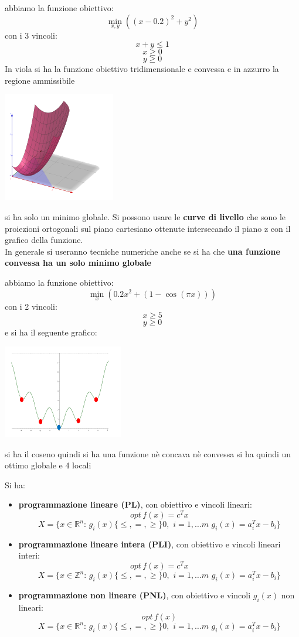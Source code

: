 \documentclass[a4paper,12pt, oneside]{book}
\begin{document}
\newpage
\begin{esempio}
  abbiamo la funzione obiettivo:
  \[\min_{x,y}((x-0.2)^2+y^2)\]
  con i 3 vincoli:
  \[x+y \leq 1\]
  \[x\geq 0\]
  \[y\geq 0\]
  In viola si ha la funzione obiettivo tridimensionale e convessa
  e in azzurro la regione ammissibile
  \begin{center}
    \includegraphics[scale = 1.3]{img/optes.png}
  \end{center}
  si ha solo un minimo globale.
  Si possono usare le \textbf{curve di livello} che sono le proiezioni
  ortogonali sul piano cartesiano ottenute intersecando il piano z con
  il grafico della funzione.\\
  In generale si useranno tecniche numeriche anche se si ha che
  \textbf{una funzione convessa ha un solo minimo globale}
\end{esempio}
\newpage
\begin{esempio}
  abbiamo la funzione obiettivo:
  \[\min_{x}(0.2x^2+(1-\cos(\pi x)))\]
  con i 2 vincoli:
  \[x\geq 5\]
  \[y\geq 0\]
  e si ha il seguente grafico:
  \begin{center}
    \includegraphics[scale = 1.3]{img/optes2.png}
  \end{center}
  si ha il coseno quindi si ha una funzione nè concava nè convessa
  si ha quindi un ottimo globale e 4 locali
\end{esempio}
Si ha:
\begin{itemize}
  \item \textbf{programmazione lineare (PL)}, con obiettivo e vincoli
  lineari:
  \[opt\,f(x)=c^T x\]
  \[X=\{x\in\mathbb{R}^n:\, g_i(x)\{\leq, =, \geq\}0,\,\,
    i=1,\ldots m\,\, g_i(x)=a_i^T x-b_i\}\]
  \item \textbf{programmazione lineare intera (PLI)}, con obiettivo e
  vincoli lineari interi:
  \[opt\,f(x)=c^T x\]
  \[X=\{x\in\mathbb{Z}^n:\, g_i(x)\{\leq, =, \geq\}0,\,\,
    i=1,\ldots m\,\, g_i(x)=a_i^T x-b_i\}\]
  \item \textbf{programmazione non lineare (PNL)}, con obiettivo e
  vincoli $g_i(x)$ non lineari:
  \[opt\,f(x)\]
  \[X=\{x\in\mathbb{R}^n:\, g_i(x)\{\leq, =, \geq\}0,\,\,
    i=1,\ldots m\,\, g_i(x)=a_i^T x-b_i\}\]
\end{itemize}
\end{document}
